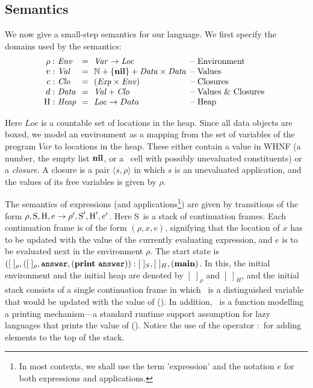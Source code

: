 \documentclass[9pt]{sigplanconf}
\newcommand{\stk}{\mbox{S}}
\begin{document}
\subsection{Semantics}
We now give  a small-step semantics for our  language.
We first specify the domains used by the semantics:
\[
\begin{array}{@{}r@{\ }l@{\ \ }c@{\ \ }l@{\hspace{0.5em}}l}
\rho: & \mathit{Env} &=&\mathit{Var} \rightarrow \mathit{Loc} & \mbox{-- Environment} \\
v:   & \mathit{Val} &=& \mathbb{N} + \{\NIL\} + \mathit{Data \times Data}& \mbox{-- Values}\\
c:   & \mathit{Clo} &=& \mathit{(Exp \times Env)}& \mbox{-- Closures}\\
d: & \mathit{Data} &=&\mathit{Val} + \mathit{Clo} & \mbox{-- Values \& Closures} \\
\heap: & \mathit{Heap} & =&\mathit{Loc} \rightarrow Data & \mbox{-- Heap}
\end{array}
\]

Here  $\mathit{Loc}$ is  a countable  set  of locations  in the  heap.
Since all data objects are boxed, we model an environment as a mapping
from the set  of variables of the program  $\mathit{Var}$ to locations
in the  heap.  These  either contain  a value in  WHNF (a  number, the
empty  list  $\mbox{$\mathbf{ nil}$}$,  or  a  \CONS\  cell  with  possibly  unevaluated
constituents) or  a {\em  closure}.  A closure  is a pair  $\langle s,
\rho\rangle$  in which  $s$  is an  unevaluated  application, and  the
values of its free variables is given by $\rho$.

The  semantics  of   expressions  (and  applications\footnote{In  most
  contexts, we  shall use  the term 'expression' and the notation $e$  for
both  expressions and
  applications.}) are  given by transitions  of the form  $\rho, \stk,
\heap, e \rightarrow \rho', \stk', \heap', e'$.  Here \stk\ is a stack
of  continuation  frames.  Each  continuation  frame  is  of the  form
$(\rho, x, e)$, signifying that the  location of $x$ has to be updated
with the  value of the currently  evaluating expression, and $e$  is to be
evaluated  next  in  the  environment  $\rho$.   The  start  state  is
$([\;]_\rho,([\;]_\rho,  \mathbf{\mbox{\tt answer}},   (\mathbf{print}~\mathbf{\mbox{\tt answer}})):[\;]_{S}  ,  [\;]_{H},
(\mathbf{main})$.  In  this, the initial  environment and the  initial heap
are  denoted  by  $[\;]_\rho$  and  $[\;]_H$, and  the  initial  stack
consists  of  a  single  continuation   frame  in  which  \ans\  is  a
distinguished  variable  that  would  be  updated with  the  value  of
(\mainpgm).  In  addition, \print\ is a function  modelling a printing
mechanism---a standard  runtime support assumption  for lazy languages
that prints the  value of (\mainpgm).  Notice the  use of the operator
$:$ for adding elements to the top of the stack.
\end{document}
